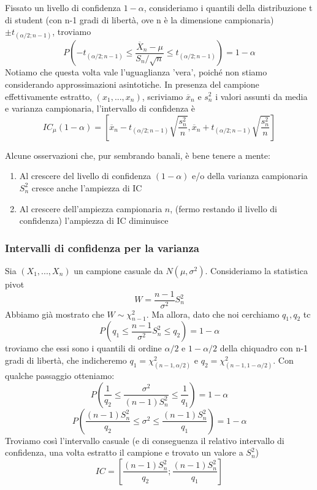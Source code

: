 Fissato un livello di confidenza $1-\alpha$, consideriamo i quantili della distribuzione t di student (con n-1 gradi di libertà, ove n è la dimensione campionaria) 
$\pm t_{(\alpha/2;n-1)}$, 
troviamo $$ P\left(-t_{(\alpha/2;n-1)} \leq \frac{\overline{X}_n - \mu}{S_n / \sqrt{n}}
 \leq t_{(\alpha/2;n-1)}\right) = 1 - \alpha $$
Notiamo che questa volta vale l'uguaglianza 'vera', poiché non stiamo considerando approssimazioni asintotiche. 
In presenza del campione effettivamente estratto, $(x_1,...,x_n)$, 
scriviamo $\overline{x}_n$ e $s^2_n$ i valori assunti da media e varianza campionaria,
l'intervallo di confidenza è $$IC_{\mu}(1-\alpha)=
\left[\overline{x}_n -
 t_{(\alpha / 2;n-1)} 
 \sqrt{\frac{s^2_n}{n}},
  \overline{x}_n + t_{(\alpha / 2;n-1)}\sqrt{\frac{s^2_n}{n}}\right]$$
\begin{oss}
Alcune osservazioni che, pur sembrando banali, è bene tenere a mente:
\begin{enumerate}
\item Al crescere del livello di confidenza $(1-\alpha)$ e/o della varianza campionaria $S^2_n$ cresce anche l'ampiezza di IC
\item Al crescere dell'ampiezza campionaria $n$, (fermo restando il livello di confidenza) l'ampiezza di IC diminuisce
\end{enumerate}
\end{oss}

\subsubsection{Intervalli di confidenza per la varianza}
Sia $(X_1,...,X_n)$ un campione casuale da $N(\mu,\sigma^2)$.
Consideriamo la statistica pivot $$W=\frac{n-1}{\sigma^2} S^2_n$$ Abbiamo già mostrato che $W \sim \chi^2_{n-1}$. 
Ma allora, dato che noi cerchiamo $q_1,q_2$ tc $$P(q_1 \leq \frac{n-1}{\sigma^2} S^2_n \leq q_2)=1-\alpha$$ troviamo che essi sono i quantili di ordine $\alpha / 2$ e $1 - \alpha / 2$ della chiquadro con n-1 gradi di libertà, che indicheremo $q_1=\chi^2_{(n-1,\alpha / 2)}$ e $q_2=\chi^2_{(n-1,1 - \alpha / 2)}$.
Con qualche passaggio otteniamo:
$$P(\frac{1}{q_2} \leq \frac{\sigma^2}{(n-1) S^2_n} \leq \frac{1}{q_1})=1-\alpha$$
$$P(\frac{(n-1) S^2_n}{q_2} \leq \sigma^2 \leq \frac{(n-1) S^2_n}{q_1})=1-\alpha$$
Troviamo così l'intervallo casuale (e di conseguenza il relativo intervallo di confidenza, una volta estratto il campione e trovato un valore a $S^2_n$) $$IC=\left[ \frac{(n-1)S^2_n}{q_2};\frac{(n-1)S^2_n}{q_1} \right]$$

